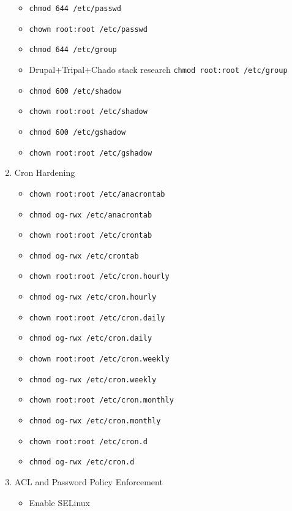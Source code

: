 \documentclass[12pt, letterpaper,oneocolumn]{article}
\begin{document}
\begin{appendices}
\begin{enumerate}
  \begin{itemize}
  \item
    \texttt{chmod\ 644\ /etc/passwd}
  \item
    \texttt{chown\ root:root\ /etc/passwd}
  \item
    \texttt{chmod\ 644\ /etc/group}
  \item
Drupal+Tripal+Chado stack research    \texttt{chmod\ root:root\ /etc/group}
  \item
    \texttt{chmod\ 600\ /etc/shadow}
  \item
    \texttt{chown\ root:root\ /etc/shadow}
  \item
    \texttt{chmod\ 600\ /etc/gshadow}
  \item
    \texttt{chown\ root:root\ /etc/gshadow}
  \end{itemize}
\item
  Cron Hardening

  \begin{itemize}
  \item
    \texttt{chown\ root:root\ /etc/anacrontab}
  \item
    \texttt{chmod\ og-rwx\ /etc/anacrontab}
  \item
    \texttt{chown\ root:root\ /etc/crontab}
  \item
    \texttt{chmod\ og-rwx\ /etc/crontab}
  \item
    \texttt{chown\ root:root\ /etc/cron.hourly}
  \item
    \texttt{chmod\ og-rwx\ /etc/cron.hourly}
  \item
    \texttt{chown\ root:root\ /etc/cron.daily}
  \item
    \texttt{chmod\ og-rwx\ /etc/cron.daily}
  \item
    \texttt{chown\ root:root\ /etc/cron.weekly}
  \item
    \texttt{chmod\ og-rwx\ /etc/cron.weekly}
  \item
    \texttt{chown\ root:root\ /etc/cron.monthly}
  \item
    \texttt{chmod\ og-rwx\ /etc/cron.monthly}
  \item
    \texttt{chown\ root:root\ /etc/cron.d}
  \item
    \texttt{chmod\ og-rwx\ /etc/cron.d}
  \end{itemize}
\item
  ACL and Password Policy Enforcement

  \begin{itemize}
  \item
    Enable SELinux


\end{itemize}
\end{enumerate}
\end{appendices}
\end{document}
